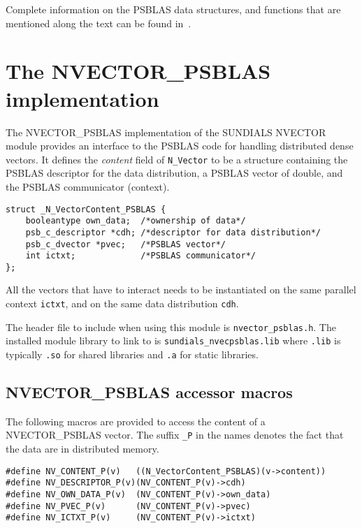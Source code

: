 \documentclass[twoside,a4paper]{refart}
\begin{document}
	Complete information on the PSBLAS data structures, and functions that are mentioned along the text can be found in~\cite{psblasguide}.
	
	
	\section{The NVECTOR\_PSBLAS implementation}\label{sec:nvector}
	The NVECTOR\_PSBLAS implementation of the SUNDIALS NVECTOR module provides an interface to the PSBLAS code for handling distributed dense vectors. 
	It defines the \emph{content} field of \texttt{N\_Vector} to be a structure containing the PSBLAS descriptor for the data distribution, a PSBLAS vector of double, and the PSBLAS communicator (context).
	
\begin{lstlisting}[style=CStyle]
struct _N_VectorContent_PSBLAS {
	booleantype own_data;  /*ownership of data*/
	psb_c_descriptor *cdh; /*descriptor for data distribution*/
	psb_c_dvector *pvec;   /*PSBLAS vector*/
	int ictxt;             /*PSBLAS communicator*/
};
\end{lstlisting}
	
	\attention All the vectors that have to interact needs to be instantiated on the same parallel context \lstinline[style=CStyle]|ictxt|, and on the same data distribution \lstinline[style=CStyle]|cdh|.
	
	
	The header file to include when using this module is \texttt{nvector\_psblas.h}. The installed module library to link to is \texttt{sundials\_nvecpsblas.lib} where \texttt{.lib} is typically \texttt{.so} for shared libraries and \texttt{.a} for static libraries.
	
	\subsection{NVECTOR\_PSBLAS accessor macros}
	
	The following macros are provided to access the content of a NVECTOR\_PSBLAS vector. The suffix \texttt{\_P} in the names denotes the fact that the data are in distributed memory.

\begin{lstlisting}[style=CStyle]
#define NV_CONTENT_P(v)   ((N_VectorContent_PSBLAS)(v->content))
#define NV_DESCRIPTOR_P(v)(NV_CONTENT_P(v)->cdh)
#define NV_OWN_DATA_P(v)  (NV_CONTENT_P(v)->own_data)
#define NV_PVEC_P(v)      (NV_CONTENT_P(v)->pvec)
#define NV_ICTXT_P(v)     (NV_CONTENT_P(v)->ictxt)
\end{lstlisting}
\end{document}

